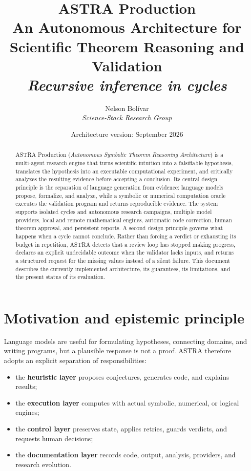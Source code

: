 \documentclass[11pt,a4paper]{article}
\title{\textbf{ASTRA Production}\\[2mm]
\large An Autonomous Architecture for Scientific Theorem Reasoning and Validation\\[1mm]
\normalsize\textit{Recursive inference in cycles}}
\author{Nelson Bolívar\\\textit{Science-Stack Research Group}}
\date{Architecture version: September 2026}
\begin{document}
\maketitle

\begin{abstract}
ASTRA Production (\textit{Autonomous Symbolic Theorem Reasoning Architecture}) is a multi-agent research engine that turns scientific intuition into a falsifiable hypothesis, translates the hypothesis into an executable computational experiment, and critically analyzes the resulting evidence before accepting a conclusion. Its central design principle is the separation of language generation from evidence: language models propose, formalize, and analyze, while a symbolic or numerical computation oracle executes the validation program and returns reproducible evidence. The system supports isolated cycles and autonomous research campaigns, multiple model providers, local and remote mathematical engines, automatic code correction, human theorem approval, and persistent reports. A second design principle governs what happens when a cycle cannot conclude. Rather than forcing a verdict or exhausting its budget in repetition, ASTRA detects that a review loop has stopped making progress, declares an explicit undecidable outcome when the validator lacks inputs, and returns a structured request for the missing values instead of a silent failure. This document describes the currently implemented architecture, its guarantees, its limitations, and the present status of its evaluation.
\end{abstract}

\section{Motivation and epistemic principle}

Language models are useful for formulating hypotheses, connecting domains, and writing programs, but a plausible response is not a proof. ASTRA therefore adopts an explicit separation of responsibilities:

\begin{itemize}
  \item the \textbf{heuristic layer} proposes conjectures, generates code, and explains results;
  \item the \textbf{execution layer} computes with actual symbolic, numerical, or logical engines;
  \item the \textbf{control layer} preserves state, applies retries, guards verdicts, and requests human decisions;
  \item the \textbf{documentation layer} records code, output, analysis, providers, and research evolution.
\end{itemize}
\end{document}
